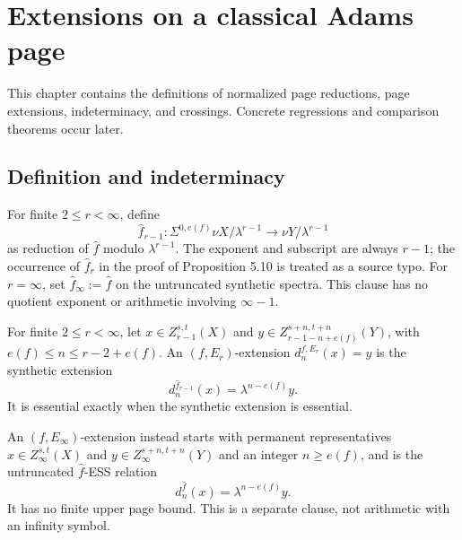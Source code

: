 \chapter{Extensions on a classical Adams page}
\label{chap:page-extensions}

This chapter contains the definitions of normalized page reductions, page extensions, indeterminacy, and crossings.  Concrete regressions and comparison theorems occur later.

\section{Definition and indeterminacy}

\begin{definition}
  \label{def:hat-map-page-reduction}
  \leanok
  For finite $2\le r<\infty$, define
  \[
    \widehat f_{r-1}:\Sigma^{0,e(f)}\nu X/\lambda^{r-1}
       \longrightarrow\nu Y/\lambda^{r-1}
  \]
  as reduction of $\widehat f$ modulo $\lambda^{r-1}$.  The exponent and
  subscript are always $r-1$; the occurrence of $\widehat f_r$ in the proof of
  Proposition 5.10 is treated as a source typo.
  For $r=\infty$, set $\widehat f_\infty:=\widehat f$ on the untruncated
  synthetic spectra.  This clause has no quotient exponent or arithmetic
  involving $\infty-1$.
\end{definition}

\begin{definition}[$(f,E_r)$-extension]
  \label{def:page-extension}
  \leanok
  For finite $2\le r<\infty$, let $x\in Z_{r-1}^{s,t}(X)$ and
  $y\in Z_{r-1-n+e(f)}^{s+n,t+n}(Y)$, with
  $e(f)\le n\le r-2+e(f)$.  An $(f,E_r)$-extension
  $d_n^{f,E_r}(x)=y$ is the synthetic extension
  \[
    d_n^{\widehat f_{r-1}}(x)=\lambda^{n-e(f)}y.
  \]
  It is essential exactly when the synthetic extension is essential.

  An $(f,E_\infty)$-extension instead starts with permanent representatives
  $x\in Z_\infty^{s,t}(X)$ and
  $y\in Z_\infty^{s+n,t+n}(Y)$ and an integer $n\ge e(f)$, and is the
  untruncated $\widehat f$-ESS relation
  \[
    d_n^{\widehat f}(x)=\lambda^{n-e(f)}y.
  \]
  It has no finite upper page bound.  This is a separate clause, not arithmetic
  with an infinity symbol.
\end{definition}

